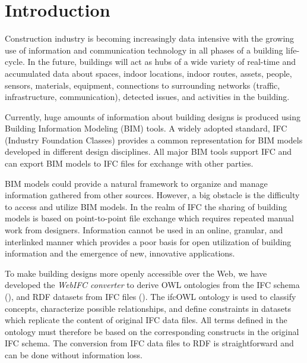\section{Introduction}
\label{sec:Introduction}

Construction industry is becoming increasingly data intensive with the growing use of
information and communication technology in all phases of a building life-cycle. 
In the future, buildings will act as hubs of a wide variety of real-time and accumulated data about
spaces, indoor locations, indoor routes, assets, people, sensors, materials, equipment, connections
to surrounding networks (traffic, infrastructure, communication), detected issues, and 
activities in the building.

Currently, huge amounts of information about building designs is produced  
using Building Information Modeling (BIM) tools. A widely adopted standard, 
IFC (Industry Foundation Classes) provides a common representation for BIM models developed in 
different design disciplines. All major BIM tools support IFC and can export BIM models to IFC files for exchange with other parties.

BIM models could provide a natural framework to organize and manage information gathered from other 
sources. However, a big obstacle is the difficulty to access and utilize BIM models. 
In the realm of IFC the sharing of building models is based on point-to-point file exchange which 
requires repeated manual work from designers. Information cannot be used in an online, granular, and 
interlinked manner which provides a poor basis for open utilization of building information and the 
emergence of new, innovative applications.

To make building designs more openly accessible over the Web, we have developed the 
\emph{WebIFC converter} to 
derive OWL ontologies from the IFC schema (\ifcowl{}), and RDF datasets from IFC files 
(\ifcrdf{}). The ifcOWL ontology is used to classify concepts, characterize possible relationships, 
and define constraints in \ifcrdf{} datasets which replicate the content of original IFC data files. 
All terms defined in the \ifcowl{} ontology must therefore be based on the corresponding constructs in 
the original IFC schema. The conversion from IFC data files to RDF is straightforward and can be done 
without information loss.

